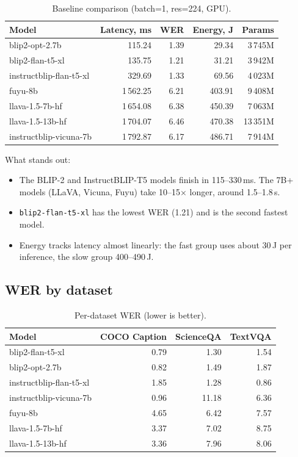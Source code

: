 \documentclass[12pt,a4paper]{article}
\begin{document}
\begin{table}[H]
\centering
\caption{Baseline comparison (batch=1, res=224, GPU).}
\begin{tabular}{@{}lrrrr@{}}
\toprule
Model & Latency, ms & WER & Energy, J & Params \\
\midrule
blip2-opt-2.7b          &   115.24 & 1.39 &  29.34 & 3\,745M \\
blip2-flan-t5-xl        &   135.75 & 1.21 &  31.21 & 3\,942M \\
instructblip-flan-t5-xl &   329.69 & 1.33 &  69.56 & 4\,023M \\
fuyu-8b                 & 1\,562.25 & 6.21 & 403.91 & 9\,408M \\
llava-1.5-7b-hf         & 1\,654.08 & 6.38 & 450.39 & 7\,063M \\
llava-1.5-13b-hf        & 1\,704.07 & 6.46 & 470.38 & 13\,351M \\
instructblip-vicuna-7b  & 1\,792.87 & 6.17 & 486.71 & 7\,914M \\
\bottomrule
\end{tabular}
\end{table}

What stands out:
\begin{itemize}[nosep]
  \item The BLIP-2 and InstructBLIP-T5 models finish in 115--330\,ms.  The 7B+ models (LLaVA, Vicuna, Fuyu) take 10--15$\times$ longer, around 1.5--1.8\,s.
  \item \texttt{blip2-flan-t5-xl} has the lowest WER (1.21) and is the second fastest model.
  \item Energy tracks latency almost linearly: the fast group uses about 30\,J per inference, the slow group 400--490\,J.
\end{itemize}

\subsection{WER by dataset}

\begin{table}[H]
\centering
\caption{Per-dataset WER (lower is better).}
\begin{tabular}{@{}lrrr@{}}
\toprule
Model & COCO Caption & ScienceQA & TextVQA \\
\midrule
blip2-flan-t5-xl        & 0.79 &  1.30 & 1.54 \\
blip2-opt-2.7b          & 0.82 &  1.49 & 1.87 \\
instructblip-flan-t5-xl & 1.85 &  1.28 & 0.86 \\
instructblip-vicuna-7b  & 0.96 & 11.18 & 6.36 \\
fuyu-8b                 & 4.65 &  6.42 & 7.57 \\
llava-1.5-7b-hf         & 3.37 &  7.02 & 8.75 \\
llava-1.5-13b-hf        & 3.36 &  7.96 & 8.06 \\
\bottomrule
\end{tabular}
\end{table}
\end{document}
